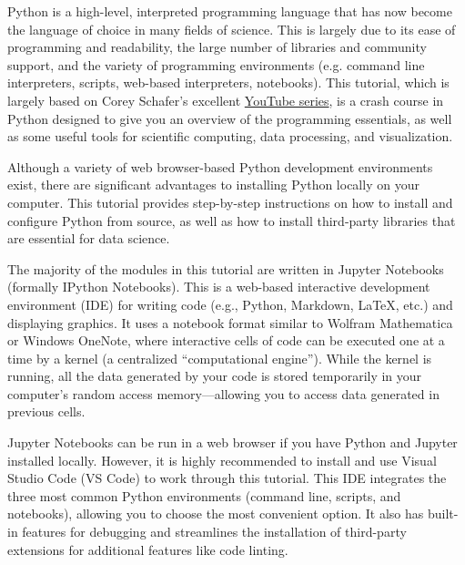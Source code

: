 \documentclass{UNB-Physics-Assignment}
\begin{document}
\maketitle


\noindent
Python is a high-level, interpreted programming language that has now become the language of choice in many fields of science. This is largely due to its ease of programming and readability, the large number of libraries and community support, and the variety of programming environments (e.g. command line interpreters, scripts, web-based interpreters, notebooks). This tutorial, which is largely based on Corey Schafer's excellent \href{https://www.youtube.com/@coreyms/featured}{YouTube series}, is a crash course in Python designed to give you an overview of the programming essentials, as well as some useful tools for scientific computing, data processing, and visualization.

Although a variety of web browser-based Python development environments exist, there are significant advantages to installing Python locally on your computer. This tutorial provides step-by-step instructions on how to install and configure Python from source, as well as how to install third-party libraries that are essential for data science.

The majority of the modules in this tutorial are written in Jupyter Notebooks (formally IPython Notebooks). This is a web-based interactive development environment (IDE) for writing code (e.g., Python, Markdown, \LaTeX, etc.) and displaying graphics. It uses a notebook format similar to Wolfram Mathematica or Windows OneNote, where interactive cells of code can be executed one at a time by a kernel (a centralized ``computational engine''). While the kernel is running, all the data generated by your code is stored temporarily in your computer's random access memory---allowing you to access data generated in previous cells.

Jupyter Notebooks can be run in a web browser if you have Python and Jupyter installed locally. However, it is highly recommended to install and use Visual Studio Code (VS Code) to work through this tutorial. This IDE integrates the three most common Python environments (command line, scripts, and notebooks), allowing you to choose the most convenient option. It also has built-in features for debugging and streamlines the installation of third-party extensions for additional features like code linting.
\end{document}
